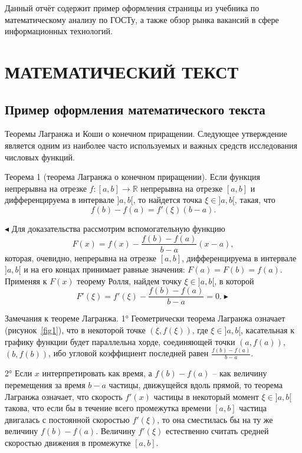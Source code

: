 \documentclass[14pt]{extreport}
\begin{document}
\pagestyle{empty} %


\pagestyle{plain} %
\tableofcontents
 



\intro\label{intro}



Данный отчёт содержит пример оформления страницы из учебника по математическому анализу \cite{bib1} по ГОСТу, а также обзор рынка вакансий в сфере информационных технологий.


\chapter{МАТЕМАТИЧЕСКИЙ ТЕКСТ\label{chapter1}}
\section{Пример оформления математического текста}

Теоремы Лагранжа и Коши о конечном приращении. Следующее утверждение является одним из наиболее часто используемых и важных средств исследования числовых функций.

Теорема 1 (теорема Лагранжа о конечном приращении). Если функция 
 непрерывна на отрезке $f: [a,b] \rightarrow \mathbb{R}$ непрерывна на отрезке $[a,b]$ и дифференцируема в интервале $]a,b[$, то найдется точка $\xi\in]a,b[$,  такая, что
\begin{equation}\label{1} \tag{1}
f(b)-f(a)=f'(\xi)(b-a).
\end{equation}
 
$ \blacktriangleleft$ Для доказательства рассмотрим вспомогательную функцию
\[F(x)=f(x)-\frac{f(b)-f(a)}{b-a}(x-a),\]
которая, очевидно, непрерывна на отрезке $[a,b]$, дифференцируема в интервале $]a,b[$ и на его концах принимает равные значения: $F(a)=F(b)=f(a)$. Применяя к $F(x)$ теорему Ролля, найдем точку $\xi\in]a,b[$, в которой
\[F'(\xi)=f'(\xi)-\frac{f(b)-f(a)}{b-a}=0. \blacktriangleright\]

Замечания к теореме Лагранжа. 1° Геометрически теорема Лагранжа означает (рисунок~\ref{fig1}), что в некоторой точке $(\xi,f(\xi))$, где $\xi\in]a,b[$, касательная к графику функции будет параллельна хорде, соединяющей точки $(a,f(a)),$ $(b,f(b))$, ибо угловой коэффициент последней равен $\frac{f(b)-f(a)}{b-a}$.

2° Если $x$ интерпретировать как время, а $f(b)-f(a)$ – как величину перемещения за время $b-a$ частицы, движущейся вдоль прямой, то теорема Лагранжа означает, что скорость $f'(x)$ частицы в некоторый момент $\xi\in]a,b[$ такова, что если бы в течение всего промежутка времени $[a,b]$ частица двигалась с постоянной скоростью $f'(\xi)$, то она сместилась бы на ту же величину $f(b)-f(a)$. Величину $f'(\xi)$ естественно считать средней скоростью движения в промежутке $[a,b]$.
\end{document}
